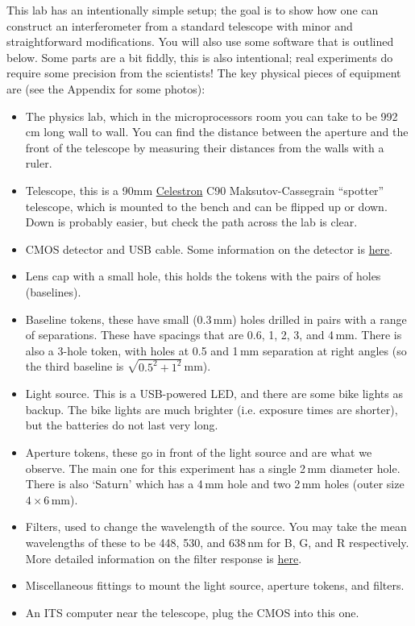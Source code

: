 \documentclass[11pt]{article}
\begin{document}
This lab has an intentionally simple setup; the goal is to show how one can construct an interferometer from a standard telescope with minor and straightforward modifications. You will also use some software that is outlined below. Some parts are a bit fiddly, this is also intentional; real experiments do require some precision from the scientists! The key physical pieces of equipment are (see the Appendix for some photos):
\begin{itemize}
    \item The physics lab, which in the microprocessors room you can take to be 992\,cm long wall to wall. You can find the distance between the aperture and the front of the telescope by measuring their distances from the walls with a ruler.
    \item Telescope, this is a 90mm \href{https://www.celestron.com/products/c90-mak-spotting-scope#description}{Celestron} C90 Maksutov-Cassegrain ``spotter'' telescope, which is mounted to the bench and can be flipped up or down. Down is probably easier, but check the path across the lab is clear.
    \item CMOS detector and USB cable. Some information on the detector is \href{https://www.qhyccd.com/qhy5l-ii-planetary-guiding-camera/}{here}.
    \item Lens cap with a small hole, this holds the tokens with the pairs of holes (baselines).
    \item Baseline tokens, these have small (0.3\,mm) holes drilled in pairs with a range of separations. These have spacings that are 0.6, 1, 2, 3, and 4\,mm. There is also a 3-hole token, with holes at 0.5 and 1\,mm separation at right angles (so the third baseline is $\sqrt{0.5^2 + 1^2}$\,mm).
    \item Light source. This is a USB-powered LED, and there are some bike lights as backup. The bike lights are much brighter (i.e. exposure times are shorter), but the batteries do not last very long.
    \item Aperture tokens, these go in front of the light source and are what we observe. The main one for this experiment has a single 2\,mm diameter hole. There is also `Saturn' which has a 4\,mm hole and two 2\,mm holes (outer size $4 \times 6$\,mm).
    \item Filters, used to change the wavelength of the source. You may take the mean wavelengths of these to be 448, 530, and 638\,nm for B, G, and R respectively. More detailed information on the filter response is \href{https://www.firstlightoptics.com/rgb-filters-filter-sets/zwo-2-lrgb-filter-set.html}{here}.
    \item Miscellaneous fittings to mount the light source, aperture tokens, and filters.
    \item An ITS computer near the telescope, plug the CMOS into this one.
\end{itemize}
\end{document}
